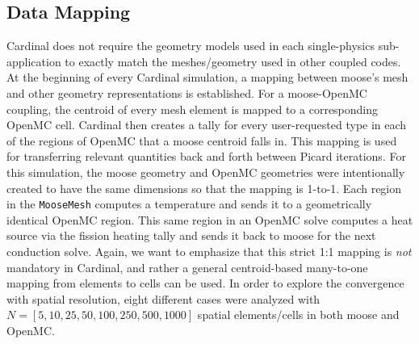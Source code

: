 \documentclass[letterpaper]{mc2023}
\begin{document}
\subsection{Data Mapping}
Cardinal does not require the geometry models used in each single-physics sub-application to exactly match the meshes/geometry used in
other coupled codes. At the beginning of every Cardinal simulation, a mapping between \gls{moose}'s mesh and other geometry representations
is established. For a \gls{moose}-OpenMC coupling, the centroid of every mesh element is mapped to a corresponding OpenMC cell. Cardinal
then creates a tally for every user-requested type in each of the regions of OpenMC that a \gls{moose} centroid falls in. This mapping is
used for transferring relevant quantities back and forth between Picard iterations. For this simulation, the \gls{moose} geometry and OpenMC
geometries were intentionally created to have the same dimensions so that the mapping is 1-to-1. Each region in the \texttt{MooseMesh}
computes a temperature and sends it to a geometrically identical OpenMC region. This same region in an OpenMC solve computes a heat source
via the fission heating tally and sends it back to \gls{moose} for the next conduction solve. Again, we want to emphasize that this strict
1:1 mapping is {\it not} mandatory in Cardinal, and rather a general centroid-based many-to-one mapping from elements to cells can be used.
In order to explore the convergence with spatial resolution, eight different cases were analyzed with $N=[5,10,25,50,100,250,500,1000]$
spatial elements/cells in both \gls{moose} and OpenMC.
\end{document}
